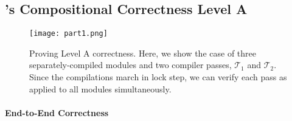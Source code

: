 

\subsection{\sepcomp{}'s Compositional Correctness Level A}
\label{sec:overview:LevelA}

\begin{figure}[!t]
\begin{center}
\texttt{[image: part1.png]}
\end{center}
\caption{Proving Level A correctness.  Here, we show the case
  of three separately-compiled modules and two compiler passes,
  $\mathcal{T}_1$ and $\mathcal{T}_2$.  Since the compilations march
  in lock step, we can verify each pass as applied to all modules
  simultaneously.}
\label{fig:LevelA}
\end{figure}


\paragraph{End-to-End Correctness}

